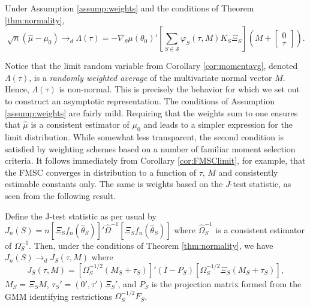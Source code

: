 \begin{cor}
\label{cor:momentavg}
Under Assumption \ref{assump:weights} and the conditions of Theorem \ref{thm:normality},
	$$\sqrt{n}\left(\widehat{\mu} -  \mu_0\right) \rightarrow_{d}\Lambda(\tau) =  -\nabla_\theta\mu(\theta_0)'\left[\sum_{S \in \mathscr{S}} \varphi_S(\tau,M) K_S\Xi_S\right] \left(M + \left[\begin{array}
	{c} 0 \\ \tau
\end{array} \right]\right).$$
\end{cor}
Notice that the limit random variable from Corollary \ref{cor:momentavg}, denoted $\Lambda(\tau)$, is a \emph{randomly weighted average} of the multivariate normal vector $M$. 
Hence, $\Lambda(\tau)$ is non-normal. 
This is precisely the behavior for which we set out to construct an asymptotic representation.
The conditions of Assumption \ref{assump:weights} are fairly mild. 
Requiring that the weights sum to one ensures that $\widehat{\mu}$ is a consistent estimator of $\mu_0$ and leads to a simpler expression for the limit distribution. 
While somewhat less transparent, the second condition is satisfied by weighting schemes based on a number of familiar moment selection criteria.
It follows immediately from Corollary \ref{cor:FMSClimit}, for example, that the FMSC converges in distribution to a function of $\tau$, $M$ and consistently estimable constants only. 
The same is weights based on the $J$-test statistic, as seen from the following result.
\begin{thm} 
\label{pro:jstat}
	Define the J-test statistic as per usual by $J_n(S)  = n \left[\Xi_S f_n(\widehat{\theta}_S)\right]' \widehat{\Omega}^{-1}\left[\Xi_S f_n(\widehat{\theta}_S)\right]$ where $\widehat{\Omega}^{-1}_S$ is a consistent estimator of $\Omega_S^{-1}$. Then, under the conditions of Theorem \ref{thm:normality}, we have $J_n(S) \rightarrow_dJ_S(\tau, M)$ where
		$$J_S(\tau, M)=[\Omega_S^{-1/2}(M_S + \tau_S)]' (I - P_S)[\Omega_S^{-1/2}\Xi_S(M_S + \tau_S)],$$
$M_S = \Xi_S M$, $\tau_S' = (0', \tau')\Xi_S'$, and $P_S$ is the projection matrix formed from the GMM identifying restrictions $\Omega^{-1/2}_S F_S$.
\end{thm}


